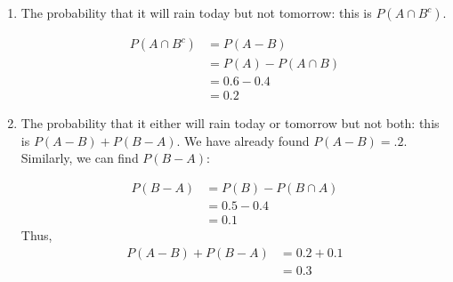 \begin{example}
\begin{solution}
\begin{enumerate}[label=(\alph*)]
    \item The probability that it will rain today but not tomorrow: this is $P\left(A \cap B^c\right)$.

    \begin{align*}
        P(A \cap B^c) &= P(A - B) \\
                      &= P(A) - P(A \cap B) \\
                      &= 0.6 - 0.4 \\
                      &= 0.2
        \end{align*}
        
    \item The probability that it either will rain today or tomorrow but not both: this is $P(A-B)+P(B-A)$. We have already found $P(A-B)=.2$. Similarly, we can find $P(B-A)$:
    
    \begin{align*}
        P(B-A) & =P(B)-P(B \cap A) \\
        & =0.5-0.4 \\
        & =0.1
        \end{align*}
    Thus,
    \begin{align*}
        P(A-B)+P(B-A) &= 0.2+0.1 \\
                      &= 0.3
    \end{align*}
\end{enumerate}
\end{solution}
\end{example}
